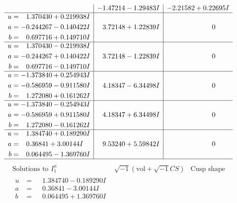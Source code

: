 \documentclass[1p]{elsarticle_modified}
\theoremstyle{definition}
\newcommand{\I}{\sqrt{-1}}
\begin{document}
$$\begin{array}{c|c|c}
 & -1.47214 - 1.29483 I & -2.21582 + 0.22695 I \\ \hline\begin{aligned}
u &= \phantom{-}1.370430 + 0.219938 I \\
a &= -0.244267 - 0.140422 I \\
b &= \phantom{-}0.697716 + 0.149710 I\end{aligned}
 & \phantom{-}3.72148 + 1.22839 I & \phantom{-0.000000 } 0 \\ \hline\begin{aligned}
u &= \phantom{-}1.370430 - 0.219938 I \\
a &= -0.244267 + 0.140422 I \\
b &= \phantom{-}0.697716 - 0.149710 I\end{aligned}
 & \phantom{-}3.72148 - 1.22839 I & \phantom{-0.000000 } 0 \\ \hline\begin{aligned}
u &= -1.373840 + 0.254943 I \\
a &= -0.586959 - 0.911580 I \\
b &= \phantom{-}1.272080 + 0.161262 I\end{aligned}
 & \phantom{-}4.18347 - 6.34498 I & \phantom{-0.000000 } 0 \\ \hline\begin{aligned}
u &= -1.373840 - 0.254943 I \\
a &= -0.586959 + 0.911580 I \\
b &= \phantom{-}1.272080 - 0.161262 I\end{aligned}
 & \phantom{-}4.18347 + 6.34498 I & \phantom{-0.000000 } 0 \\ \hline\begin{aligned}
u &= \phantom{-}1.384740 + 0.189290 I \\
a &= \phantom{-}0.36841 + 3.00144 I \\
b &= \phantom{-}0.064495 - 1.369760 I\end{aligned}
 & \phantom{-}9.53240 + 5.59842 I & \phantom{-0.000000 } 0\\
 \hline 
 \end{array}$$\newpage$$\begin{array}{c|c|c}  
\text{Solutions to }I^u_{1}& \I (\text{vol} + \sqrt{-1}CS) & \text{Cusp shape}\\
 \hline 
\begin{aligned}
u &= \phantom{-}1.384740 - 0.189290 I \\
a &= \phantom{-}0.36841 - 3.00144 I \\
b &= \phantom{-}0.064495 + 1.369760 I\end{aligned}

\end{array}$$
\end{document}
